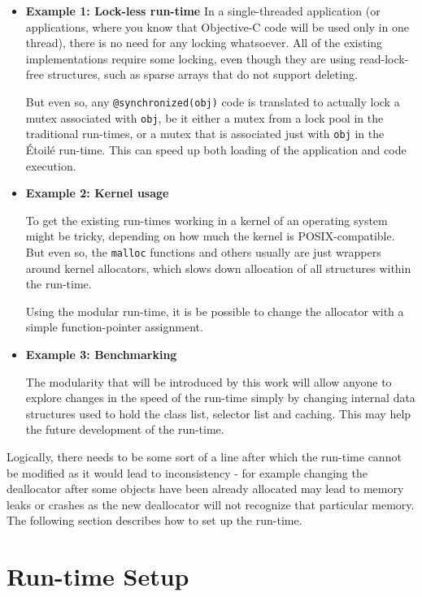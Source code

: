 \begin{itemize}
\item{\bf{Example 1: Lock-less run-time}}
In a single-threaded application (or applications, where you know that Objective-C code will be used only in one thread), there is no need for any locking whatsoever. All of the existing implementations require some locking, even though they are using read-lock-free structures, such as sparse arrays that do not support deleting.

But even so, any \verb=@synchronized(obj)= code is translated to actually lock a mutex associated with \verb=obj=, be it either a mutex from a lock pool in the traditional run-times, or a mutex that is associated just with \verb=obj= in the \'Etoil\'e run-time. This can speed up both loading of the application and code execution.

\item{\bf{Example 2: Kernel usage}}

To get the existing run-times working in a kernel of an operating system might be tricky, depending on how much the kernel is POSIX-compatible. But even so, the \verb=malloc= functions and others usually are just wrappers around kernel allocators, which slows down allocation of all structures within the run-time.

Using the modular run-time, it is be possible to change the allocator with a simple function-pointer assignment.

\item{\bf{Example 3: Benchmarking}}

The modularity that will be introduced by this work will allow anyone to explore changes in the speed of the run-time simply by changing internal data structures used to hold the class list, selector list and caching. This may help the future development of the run-time.

\end{itemize}

Logically, there needs to be some sort of a line after which the run-time cannot be modified as it would lead to inconsistency - for example changing the deallocator after some objects have been already allocated may lead to memory leaks or crashes as the new deallocator will not recognize that particular memory. The following section describes how to set up the run-time.

\section{Run-time Setup}

